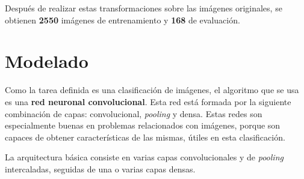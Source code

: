 \documentclass{uc3mpracticas}
\begin{document}
  \newpage


  Después de realizar estas transformaciones sobre las imágenes originales, se obtienen \textbf{2550} imágenes de entrenamiento y \textbf{168} de evaluación.


  \section{Modelado}

  Como la tarea definida es una clasificación de imágenes, el algoritmo que se usa es una \textbf{red neuronal convolucional}. Esta red está formada por la siguiente combinación de capas: convolucional, \textit{pooling} y densa. Estas redes son especialmente buenas en problemas relacionados con imágenes, porque son capaces de obtener características de las mismas, útiles en esta clasificación.

  \vspace{3mm}

  La arquitectura básica consiste en varias capas convolucionales y de \textit{pooling} intercaladas, seguidas de una o varias capas densas.
\end{document}
